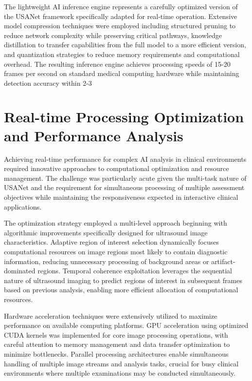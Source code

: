 The lightweight AI inference engine represents a carefully optimized version of the USANet framework specifically adapted for real-time operation. Extensive model compression techniques were employed including structured pruning to reduce network complexity while preserving critical pathways, knowledge distillation to transfer capabilities from the full model to a more efficient version, and quantization strategies to reduce memory requirements and computational overhead. The resulting inference engine achieves processing speeds of 15-20 frames per second on standard medical computing hardware while maintaining detection accuracy within 2-3%

\section{Real-time Processing Optimization and Performance Analysis}

Achieving real-time performance for complex AI analysis in clinical environments required innovative approaches to computational optimization and resource management. The challenge was particularly acute given the multi-task nature of USANet and the requirement for simultaneous processing of multiple assessment objectives while maintaining the responsiveness expected in interactive clinical applications.

The optimization strategy employed a multi-level approach beginning with algorithmic improvements specifically designed for ultrasound image characteristics. Adaptive region of interest selection dynamically focuses computational resources on image regions most likely to contain diagnostic information, reducing unnecessary processing of background areas or artifact-dominated regions. Temporal coherence exploitation leverages the sequential nature of ultrasound imaging to predict regions of interest in subsequent frames based on previous analysis, enabling more efficient allocation of computational resources.

Hardware acceleration techniques were extensively utilized to maximize performance on available computing platforms. GPU acceleration using optimized CUDA kernels was implemented for core image processing operations, with careful attention to memory management and data transfer optimization to minimize bottlenecks. Parallel processing architectures enable simultaneous handling of multiple image streams and analysis tasks, crucial for busy clinical environments where multiple examinations may be conducted simultaneously.

